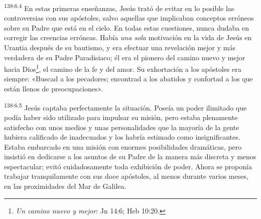 \par 
\textsuperscript{138:6.4} En estas primeras enseñanzas, Jesús trató de evitar en lo posible las controversias con sus apóstoles, salvo aquellas que implicaban conceptos erróneos sobre su Padre que está en el cielo. En todas estas cuestiones, nunca dudaba en corregir las creencias erróneas. Había \textit{una sola} motivación en la vida de Jesús en Urantia después de su bautismo, y era efectuar una revelación mejor y más verdadera de su Padre Paradisiaco; él era el pionero del camino nuevo y mejor hacia Dios\footnote{\textit{Un camino nuevo y mejor}: Jn 14:6; Heb 10:20.}, el camino de la fe y del amor. Su exhortación a los apóstoles era siempre: «Buscad a los pecadores; encontrad a los abatidos y confortad a los que están llenos de preocupaciones».

\par 
\textsuperscript{138:6.5} Jesús captaba perfectamente la situación. Poseía un poder ilimitado que podía haber sido utilizado para impulsar su misión, pero estaba plenamente satisfecho con unos medios y unas personalidades que la mayoría de la gente hubiera calificado de inadecuados y los habría estimado como insignificantes. Estaba embarcado en una misión con enormes posibilidades dramáticas, pero insistió en dedicarse a los asuntos de su Padre de la manera más discreta y menos espectacular; evitó cuidadosamente toda exhibición de poder. Ahora se proponía trabajar tranquilamente con sus doce apóstoles, al menos durante varios meses, en las proximidades del Mar de Galilea.


